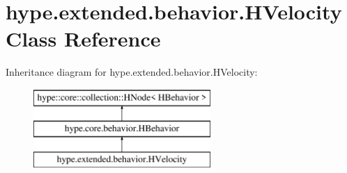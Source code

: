 \hypertarget{classhype_1_1extended_1_1behavior_1_1_h_velocity}{\section{hype.\-extended.\-behavior.\-H\-Velocity Class Reference}
\label{classhype_1_1extended_1_1behavior_1_1_h_velocity}
}
Inheritance diagram for hype.\-extended.\-behavior.\-H\-Velocity\-:\begin{figure}[H]
\begin{center}
\leavevmode
\includegraphics[height=3.000000cm]{classhype_1_1extended_1_1behavior_1_1_h_velocity}
\end{center}
\end{figure}

